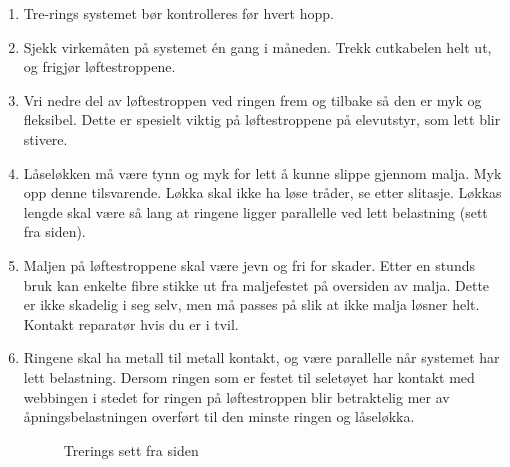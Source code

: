 \begin{enumerate}
\item Tre-rings systemet bør kontrolleres før hvert hopp.
\item Sjekk virkemåten på systemet én gang i måneden. Trekk cutkabelen helt ut, og frigjør løftestroppene.
\item Vri nedre del av løftestroppen ved ringen frem og tilbake så den er myk og fleksibel. Dette er spesielt viktig på løftestroppene på elevutstyr, som lett blir stivere.
\item Låseløkken må være tynn og myk for lett å kunne slippe gjennom malja. Myk opp denne tilsvarende. Løkka skal ikke ha løse tråder, se etter slitasje. Løkkas lengde skal være så lang at ringene ligger parallelle ved lett belastning (sett fra siden).
\item Maljen på løftestroppene skal være jevn og fri for skader. Etter en stunds bruk kan enkelte fibre stikke ut fra maljefestet på oversiden av malja. Dette er ikke skadelig i seg selv, men må passes på slik at ikke malja løsner helt. Kontakt reparatør hvis du er i tvil.
\item Ringene skal ha metall til metall kontakt, og være parallelle når systemet har lett belastning. Dersom ringen som er festet til seletøyet har kontakt med webbingen i stedet for ringen på løftestroppen blir betraktelig mer av åpningsbelastningen overført til den minste ringen og låseløkka.
\begin{figure}
	\caption{Trerings sett fra siden}
\end{figure}


\end{enumerate}
